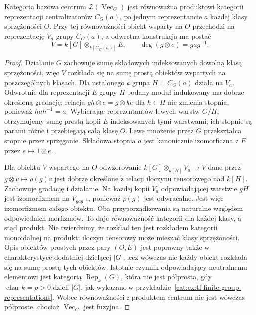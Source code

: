 \begin{stwierdzenie}\label{cat:prop:tf-center-conjugacy}
Kategoria bazowa centrum $\mathcal Z(\operatorname{Vec}_G)$ jest równoważna produktowi kategorii reprezentacji centralizatorów $C_G(a)$, po jednym reprezentancie $a$ każdej klasy sprzężoności $O$. Przy tej równoważności obiekt wsparty na $O$ przechodzi na reprezentację $V_a$ grupy $C_G(a)$, a odwrotna konstrukcja ma postać
\[
 V=k[G]\otimes_{k[C_G(a)]}E,\qquad
 \deg(g\otimes e)=gag^{-1}.
\]
\end{stwierdzenie}
\begin{proof}
Działanie $G$ zachowuje sumę składowych indeksowanych dowolną klasą sprzężoności, więc $V$ rozkłada się na sumę prostą obiektów wspartych na poszczególnych klasach. Dla ustalonego $a$ grupa $H=C_G(a)$ działa na $V_a$. Odwrotnie dla reprezentacji $E$ grupy $H$ podany moduł indukowany ma dobrze określoną gradację: relacja $gh\otimes e=g\otimes he$ dla $h\in H$ nie zmienia stopnia, ponieważ $hah^{-1}=a$. Wybierając reprezentantów lewych warstw $G/H$, otrzymujemy sumę prostą kopii $E$ indeksowanych tymi warstwami; ich stopnie są parami różne i przebiegają całą klasę $O$. Lewe mnożenie przez $G$ przekształca stopnie przez sprzęganie. Składowa stopnia $a$ jest kanonicznie izomorficzna z $E$ przez $e\mapsto1\otimes e$.

Dla obiektu $V$ wspartego na $O$ odwzorowanie $k[G]\otimes_{k[H]}V_a\to V$ dane przez $g\otimes v\mapsto\rho(g)v$ jest dobrze określone z relacji iloczynu tensorowego nad $k[H]$. Zachowuje gradację i działanie. Na każdej kopii $V_a$ odpowiadającej warstwie $gH$ jest izomorfizmem na $V_{gag^{-1}}$, ponieważ $\rho(g)$ jest odwracalne. Jest więc izomorfizmem całego obiektu. Oba przyporządkowania są naturalne względem odpowiednich morfizmów. To daje równoważność kategorii dla każdej klasy, a stąd produkt. Nie twierdzimy, że rozkład ten jest rozkładem kategorii monoidalnej na produkt: iloczyn tensorowy może mieszać klasy sprzężoności. Opis obiektów prostych przez pary $(O,E)$ jest poprawny także w charakterystyce dodatniej dzielącej $|G|$, lecz wówczas nie każdy obiekt rozkłada się na sumę prostą tych obiektów. Istotnie czynnik odpowiadający neutralnemu elementowi jest kategorią $\operatorname{Rep}_k(G)$, która nie jest półprosta, gdy $\operatorname{char} k=p>0$ dzieli $|G|$, jak wykazano w przykładzie~\ref{cat:ex:tf-finite-group-representations}. Wobec równoważności z produktem centrum nie jest wówczas półproste, chociaż $\operatorname{Vec}_G$ jest fuzyjna.
\end{proof}

